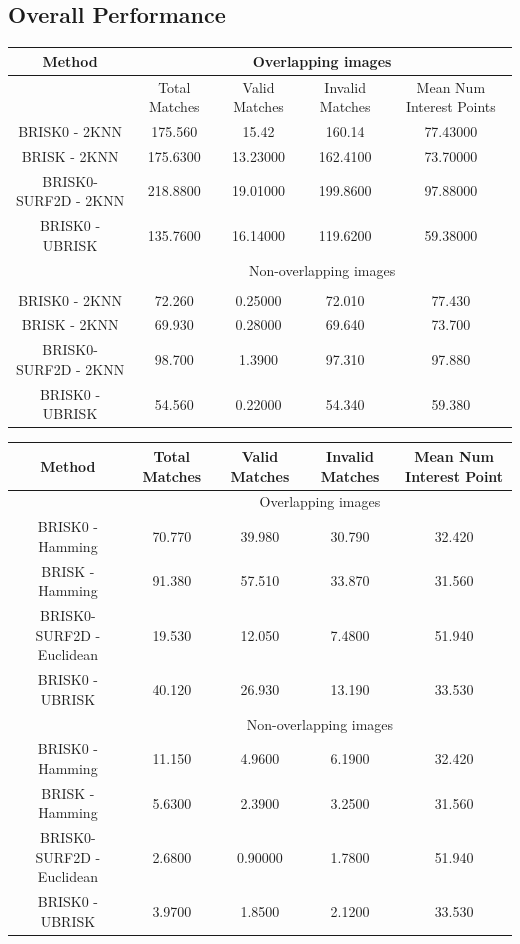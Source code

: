 \documentclass{article}
\begin{document}


\subsection{Overall Performance}
\label{sec:overallPerformance}



\begin{table}
\begin{tabular}{|c|c|c|c|c|}
\hline 
Method & \multicolumn{4}{c}{Overlapping images}\tabularnewline
\hline 
\hline 
 & Total Matches & Valid Matches & Invalid Matches & Mean Num Interest Points\tabularnewline
\hline 
BRISK0 - 2KNN & 175.560 & 15.42 & 160.14 & 77.43000\tabularnewline
\hline 
BRISK - 2KNN & 175.6300 & 13.23000 & 162.4100 & 73.70000\tabularnewline
\hline 
BRISK0-SURF2D - 2KNN & 218.8800 & 19.01000 & 199.8600 & 97.88000\tabularnewline
\hline 
BRISK0 - UBRISK & 135.7600 & 16.14000 & 119.6200 & 59.38000\tabularnewline
\hline 
 & \multicolumn{4}{c}{Non-overlapping images}\tabularnewline
\hline 
 &  &  &  & \tabularnewline
\hline 
BRISK0 - 2KNN & 72.260 & 0.25000 & 72.010 & 77.430\tabularnewline
\hline 
BRISK - 2KNN & 69.930 & 0.28000 & 69.640 & 73.700\tabularnewline
\hline 
BRISK0-SURF2D - 2KNN & 98.700 & 1.3900 & 97.310 & 97.880\tabularnewline
\hline 
BRISK0 - UBRISK & 54.560 & 0.22000 & 54.340 & 59.380\tabularnewline
\hline 
\end{tabular}
\label{tab:keypointsMatchesKNN}
\end{table}

\begin{table}
\begin{tabular}{|c|c|c|c|c|}
\hline 
Method & Total Matches & Valid Matches & Invalid Matches & Mean Num Interest Point\tabularnewline
\hline 
\hline 
 & \multicolumn{4}{c}{Overlapping images}\tabularnewline
\hline 
BRISK0 - Hamming & 70.770 & 39.980 & 30.790 & 32.420\tabularnewline
\hline 
BRISK - Hamming & 91.380 & 57.510 & 33.870 & 31.560\tabularnewline
\hline 
BRISK0-SURF2D - Euclidean & 19.530 & 12.050 & 7.4800 & 51.940\tabularnewline
\hline 
BRISK0 - UBRISK & 40.120 & 26.930 & 13.190 & 33.530\tabularnewline
\hline 
 & \multicolumn{4}{c}{Non-overlapping images}\tabularnewline
\hline 
BRISK0 - Hamming & 11.150 & 4.9600 & 6.1900 & 32.420\tabularnewline
\hline 
BRISK - Hamming & 5.6300 & 2.3900 & 3.2500 & 31.560\tabularnewline
\hline 
BRISK0-SURF2D - Euclidean & 2.6800 & 0.90000 & 1.7800 & 51.940\tabularnewline
\hline 
BRISK0 - UBRISK & 3.9700 & 1.8500 & 2.1200 & 33.530\tabularnewline
\hline 
\end{tabular}
\label{tab:keypointsMatchesHamming}
\end{table}
\end{document}
